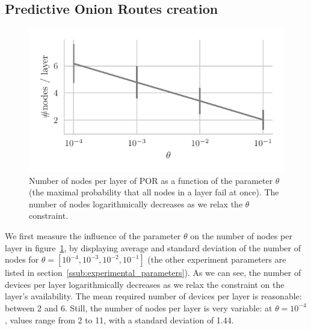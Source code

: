 


\subsection{Predictive Onion Routes creation} %
\label{sub:predictive_onion_routes_creation}

\begin{figure}[t]
\centering
\includegraphics[width=0.8\columnwidth]{figures/nodes_per_layer_vs_theta.pdf}
\caption{\label{fig:nodes_per_layer_vs_theta}Number of nodes per layer of POR as a function of the parameter $\theta$ (the maximal probability that all nodes in a layer fail at once). The number of nodes logarithmically decreases as we relax the $\theta$ constraint.}
\end{figure}

We first measure the influence of the parameter $\theta$ on the number of nodes per layer in figure~\ref{fig:nodes_per_layer_vs_theta}, by displaying average and standard deviation of the number of nodes for $\theta=[10^{-4}, 10^{-3}, 10^{-2}, 10^{-1}]$ (the other experiment parameters are listed in section~\ref{ssub:experimental_parameters}).
As we can see, the number of devices per layer logarithmically decreases as we relax the constraint on the layer's availability.
The mean required number of devices per layer is reasonable: between 2 and 6.
Still, the number of nodes per layer is very variable: at $\theta=10^{-4}$, values range from 2 to 11, with a standard deviation of 1.44. 

